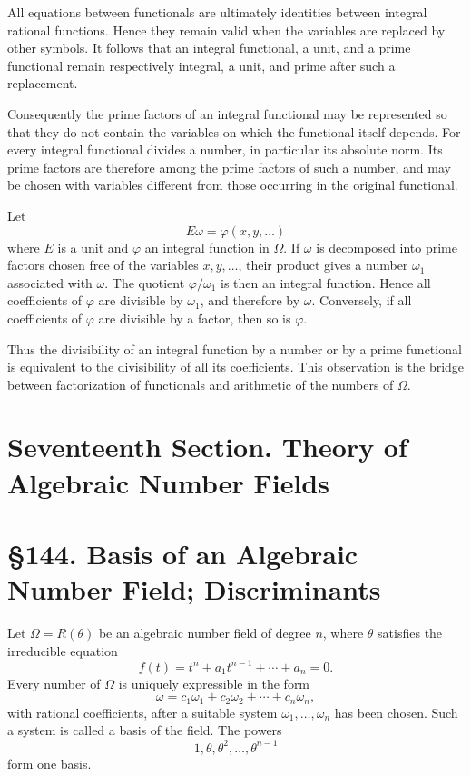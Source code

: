 \documentclass[12pt,a4paper]{article}
\newcommand{\webersection}[2]{\clearpage\section*{\S #1. #2}}
\newcommand{\booktitle}[1]{\clearpage\section*{#1}}
\begin{document}
All equations between functionals are ultimately identities between integral rational functions.  Hence they remain valid when the variables are replaced by other symbols.  It follows that an integral functional, a unit, and a prime functional remain respectively integral, a unit, and prime after such a replacement.

Consequently the prime factors of an integral functional may be represented so that they do not contain the variables on which the functional itself depends.  For every integral functional divides a number, in particular its absolute norm.  Its prime factors are therefore among the prime factors of such a number, and may be chosen with variables different from those occurring in the original functional.

Let
\begin{equation}
 E\omega=
\varphi(x,y,
\ldots) \tag{1}
\end{equation}
where \(E\) is a unit and \(\varphi\) an integral function in \(\Omega\).  If \(\omega\) is decomposed into prime factors chosen free of the variables \(x,y,
\ldots\), their product gives a number \(\omega_1\) associated with \(\omega\).  The quotient \(\varphi/
\omega_1\) is then an integral function.  Hence all coefficients of \(\varphi\) are divisible by \(\omega_1\), and therefore by \(\omega\).  Conversely, if all coefficients of \(\varphi\) are divisible by a factor, then so is \(\varphi\).

Thus the divisibility of an integral function by a number or by a prime functional is equivalent to the divisibility of all its coefficients.  This observation is the bridge between factorization of functionals and arithmetic of the numbers of \(\Omega\).

\booktitle{Seventeenth Section. Theory of Algebraic Number Fields}

\webersection{144}{Basis of an Algebraic Number Field; Discriminants}

Let \(\Omega=R(\theta)\) be an algebraic number field of degree \(n\), where \(\theta\) satisfies the irreducible equation
\begin{equation}
 f(t)=t^n+a_1t^{n-1}+\cdots+a_n=0. \tag{1}
\end{equation}
Every number of \(\Omega\) is uniquely expressible in the form
\begin{equation}
 \omega=c_1\omega_1+c_2\omega_2+
\cdots+c_n\omega_n, \tag{2}
\end{equation}
with rational coefficients, after a suitable system \(\omega_1,
\ldots,
\omega_n\) has been chosen.  Such a system is called a basis of the field.  The powers
\begin{equation}
 1,\theta,\theta^2,
\ldots,\theta^{n-1} \tag{3}
\end{equation}
form one basis.
\end{document}
